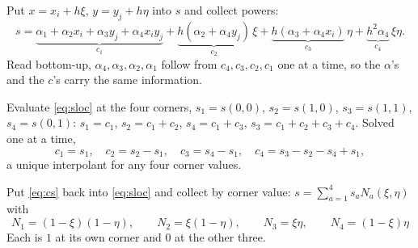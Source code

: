 \documentclass[11pt]{article}
\begin{document}
\begin{steps}
\item Put $x=x_{i}+h\xi$, $y=y_{j}+h\eta$ into $s$ and collect powers:
\begin{equation}\label{eq:sloc}
  s=\underbrace{\alpha_{1}+\alpha_{2}x_{i}+\alpha_{3}y_{j}+\alpha_{4}x_{i}y_{j}}_{c_{1}}
   +\underbrace{h(\alpha_{2}+\alpha_{4}y_{j})}_{c_{2}}\,\xi
   +\underbrace{h(\alpha_{3}+\alpha_{4}x_{i})}_{c_{3}}\,\eta
   +\underbrace{h^{2}\alpha_{4}}_{c_{4}}\,\xi\eta .
\end{equation}
      Read bottom-up, $\alpha_{4},\alpha_{3},\alpha_{2},\alpha_{1}$ follow from
      $c_{4},c_{3},c_{2},c_{1}$ one at a time, so the $\alpha$'s and the $c$'s
      carry the same information.
\item Evaluate \eqref{eq:sloc} at the four corners, $s_{1}=s(0,0)$,
      $s_{2}=s(1,0)$, $s_{3}=s(1,1)$, $s_{4}=s(0,1)$:
      $s_{1}=c_{1}$, $s_{2}=c_{1}+c_{2}$, $s_{4}=c_{1}+c_{3}$,
      $s_{3}=c_{1}+c_{2}+c_{3}+c_{4}$.  Solved one at a time,
\begin{equation}\label{eq:cs}
  c_{1}=s_{1},\quad c_{2}=s_{2}-s_{1},\quad c_{3}=s_{4}-s_{1},\quad
  c_{4}=s_{3}-s_{2}-s_{4}+s_{1},
\end{equation}
      a unique interpolant for any four corner values.
\item Put \eqref{eq:cs} back into \eqref{eq:sloc} and collect by corner value:
      $s=\sum_{a=1}^{4}s_{a}N_{a}(\xi,\eta)$ with
\begin{equation}\label{eq:shapes}
  \boxed{\;N_{1}=(1-\xi)(1-\eta),\qquad N_{2}=\xi(1-\eta),\qquad
          N_{3}=\xi\eta,\qquad N_{4}=(1-\xi)\eta\;}
\end{equation}
      Each is $1$ at its own corner and $0$ at the other three.
\end{steps}
\end{document}
